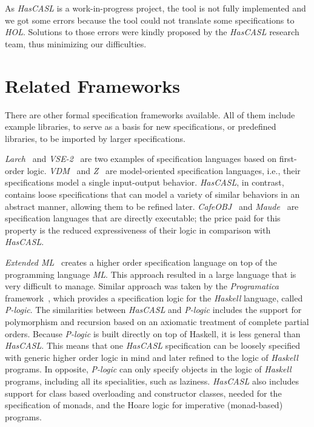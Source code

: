 \documentclass[12pt,twoside]{article}
\numberwithin{spec}{subsection}
\numberwithin{proof}{subsection}
\numberwithin{figure}{subsection}
\numberwithin{code}{subsection}
\begin{document}
As \textit{HasCASL} is a work-in-progress project, the tool is not fully implemented and we got some errors because the tool could not translate some specifications to \textit{HOL}. Solutions to those errors were kindly proposed by the \textit{HasCASL} research team, thus minimizing our difficulties.

\section{Related Frameworks}\label{RelatedFrameworks}
There are other formal specification frameworks available. All of them include example libraries, to serve as a basis for new specifications, or predefined libraries, to be imported by larger specifications.

\textit{Larch}~\citep{LarchBook} and \textit{VSE-2}~\citep{VSE} are two examples of specification languages based on first-order logic. \textit{VDM}~\citep{VDM} and \textit{Z}~\citep{ZNotation} are model-oriented specification languages, i.e., their specifications model a single input-output behavior. \textit{HasCASL}, in contrast, contains loose specifications that can model a variety of similar behaviors in an abstract manner, allowing them to be refined later. \textit{CafeOBJ}~\citep{CafeOBJReport} and \textit{Maude}~\citep{MaudeLib} are specification languages that are directly executable; the price paid for this property is the reduced expressiveness of their logic in comparison with \textit{HasCASL}.

\textit{Extended ML}~\citep{SML} creates a higher order specification language on top of the programming language \textit{ML}. This approach resulted in a large language that is very difficult to manage. Similar approach was taken by the \textit{Programatica} framework~\citep{ProgramaticaOverview}, which provides a specification logic for the \textit{Haskell} language, called \textit{P-logic}. The similarities between \textit{HasCASL} and \textit{P-logic} includes the support for polymorphism and recursion based on an axiomatic treatment of complete partial orders. Because \textit{P-logic} is built directly on top of Haskell, it is less general than \textit{HasCASL}. This means that one \textit{HasCASL} specification can be loosely specified with generic higher order logic in mind and later refined to the logic of \textit{Haskell} programs. In opposite, \textit{P-logic} can only specify objects in the logic of \textit{Haskell} programs, including all its specialities, such as laziness. \textit{HasCASL} also includes support for class based overloading and constructor classes, needed for the specification of monads, and the Hoare logic for imperative (monad-based) programs.
\end{document}
